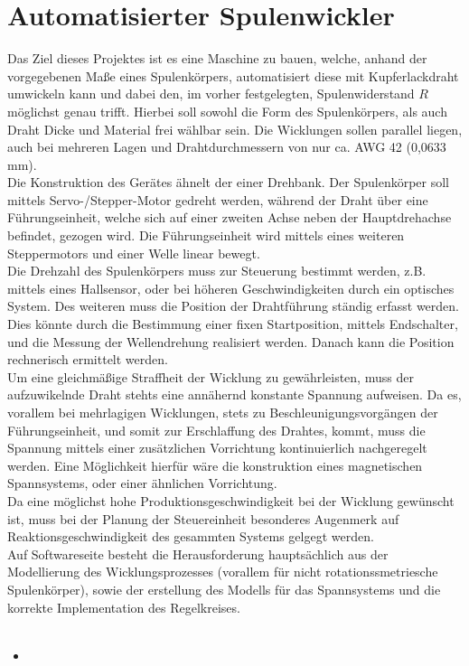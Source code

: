 \section{Automatisierter Spulenwickler}

Das Ziel dieses Projektes ist es eine Maschine zu bauen,  welche, anhand der vorgegebenen Maße eines Spulenkörpers, automatisiert diese mit Kupferlackdraht umwickeln kann und dabei den, im vorher festgelegten, Spulenwiderstand $R$ möglichst genau trifft. Hierbei soll sowohl die Form des Spulenkörpers, als auch Draht Dicke und Material frei wählbar sein. Die Wicklungen sollen parallel liegen, auch bei mehreren Lagen und Drahtdurchmessern von nur ca. AWG 42 (0,0633 mm).\\
Die Konstruktion des Gerätes ähnelt der einer Drehbank. Der Spulenkörper soll mittels Servo-/Stepper-Motor gedreht werden, während der Draht über eine Führungseinheit, welche sich auf einer zweiten Achse neben der Hauptdrehachse befindet, gezogen wird. Die Führungseinheit wird mittels eines weiteren Steppermotors und einer Welle linear bewegt.\\
Die Drehzahl des Spulenkörpers muss zur Steuerung bestimmt werden, z.B. mittels eines Hallsensor, oder bei höheren Geschwindigkeiten durch ein optisches System. Des weiteren muss die Position der Drahtführung ständig erfasst werden. Dies könnte durch die Bestimmung einer fixen Startposition, mittels Endschalter, und die Messung der Wellendrehung realisiert werden. Danach kann die Position rechnerisch ermittelt werden. 
\\ 
Um eine gleichmäßige Straffheit der Wicklung zu gewährleisten, muss der aufzuwikelnde Draht stehts eine annähernd konstante Spannung aufweisen. Da es, vorallem bei mehrlagigen Wicklungen, stets zu Beschleunigungsvorgängen der Führungseinheit, und somit zur Erschlaffung des Drahtes, kommt, muss die Spannung mittels einer zusätzlichen Vorrichtung kontinuierlich nachgeregelt werden. Eine Möglichkeit hierfür wäre die konstruktion eines magnetischen Spannsystems, oder einer ähnlichen Vorrichtung.\\
Da eine möglichst hohe Produktionsgeschwindigkeit bei der Wicklung gewünscht ist, muss bei der Planung der Steuereinheit besonderes Augenmerk auf Reaktionsgeschwindigkeit des gesammten Systems gelgegt werden.\\
Auf Softwareseite besteht die Herausforderung hauptsächlich aus der Modellierung des Wicklungsprozesses (vorallem für nicht rotationssmetriesche Spulenkörper), sowie der erstellung des Modells für das Spannsystems und die korrekte Implementation des Regelkreises.\\ 
\\

\begin{itemize}
    \item 
\end{itemize}